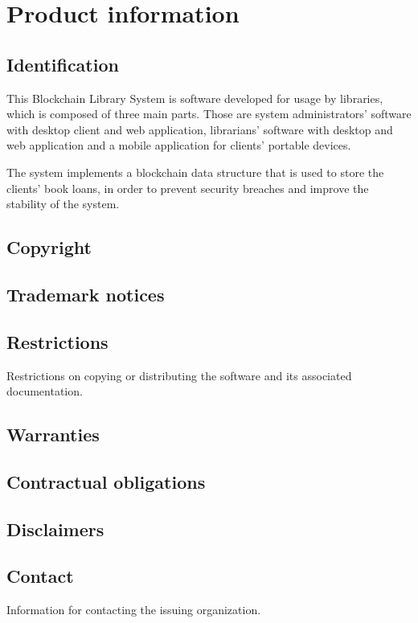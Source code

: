 \chapter{Product information}
\vspace{-6em}


\section{Identification}
This Blockchain Library System is software developed for usage by libraries,
which is composed of three main parts. Those are system administrators'
software with desktop client and web application, librarians' software with desktop and
web application and a mobile application for clients' portable devices.

The system implements a blockchain data structure that is used to store the
clients' book loans, in order to prevent security breaches and improve the
stability of the system. 

\section{Copyright}

\section{Trademark notices}

\section{Restrictions}
Restrictions on copying or distributing the software and its associated
documentation.

\section{Warranties}

\section{Contractual obligations}

\section{Disclaimers}

\section{Contact}
Information for contacting the issuing organization.